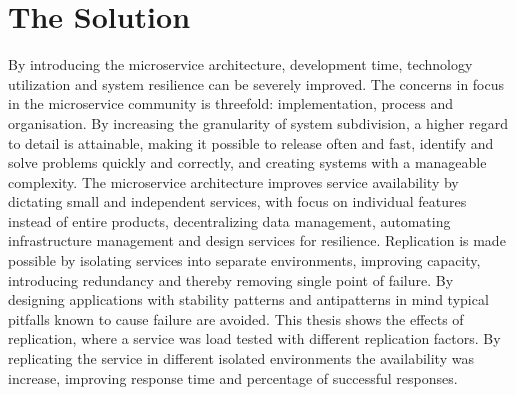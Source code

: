 

\section{The Solution}
By introducing the microservice architecture, development time, technology utilization and system resilience can be severely improved. The concerns in focus in the microservice community is threefold: implementation, process and organisation. By increasing the granularity of system subdivision, a higher regard to detail is attainable, making it possible to release often and fast, identify and solve problems quickly and correctly, and creating systems with a manageable complexity. The microservice architecture improves service availability by dictating small and independent services, with focus on individual features instead of entire products, decentralizing data management, automating infrastructure management and design services for resilience. Replication is made possible by isolating services into separate environments, improving capacity, introducing redundancy and thereby removing single point of failure. By designing applications with stability patterns and antipatterns in mind typical pitfalls known to cause failure are avoided. This thesis shows the effects of replication, where a service was load tested with different replication factors. By replicating the service in different isolated environments the availability was increase, improving response time and percentage of successful responses.

